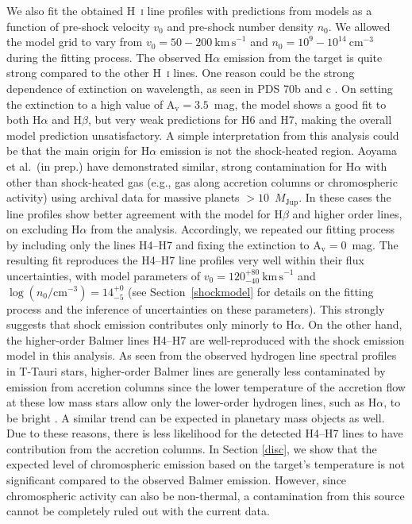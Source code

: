 \documentclass{aa}
\newcommand{\mj}{\ensuremath{M_\mathrm{Jup}}\xspace}
\newcommand{\Ha}{\ensuremath{\mathrm{H}\alpha}\xspace}
\newcommand{\Hb}{\ensuremath{\mathrm{H}\beta}\xspace}
\newcommand{\Hi}{H~\textsc{i}\xspace}
\newcommand{\kms}{\ensuremath{\mathrm{km\,s}^{-1}}\xspace}
\newcommand{\cmcube}{\ensuremath{\mathrm{cm}^{-3}}\xspace}
\begin{document}
We also fit the obtained \Hi line profiles with predictions from \cite{aoyama2020, aoyama2021} models as a function of pre-shock velocity $v_0$ and pre-shock number density $n_0$. We allowed the model grid to vary from $v_0= 50-200~\kms$ and $n_0=10^9-10^{14}~\cmcube$ during the fitting process. The observed \Ha emission from the target is quite strong compared to the other \Hi lines. One reason could be the strong dependence of extinction on wavelength, as seen in PDS 70b and c \citep{hashimoto2020}. On setting the extinction to a high value of $\mathrm{A_v=3.5}$~mag, the model shows a good fit to both \Ha and \Hb, but very weak predictions for H6 and H7, making the overall model prediction unsatisfactory. A simple interpretation from this analysis could be that the main origin for \Ha emission is not the shock-heated region. Aoyama et al.\ (in prep.) have demonstrated similar, strong contamination for \Ha with other than shock-heated gas (e.g., gas along accretion columns or chromospheric activity) using archival data for massive planets $>10$~\mj. In these cases the line profiles show better agreement with the model for \Hb and higher order lines, on excluding \Ha from the analysis. Accordingly, we repeated our fitting process by including only the lines H4--H7 and fixing the extinction to $\mathrm{A_v=0}$~mag. The resulting fit reproduces the H4--H7 line profiles very well within their flux uncertainties, with model parameters of $v_0=120^{+80}_{-40}~\kms$ and $\log(n_0/\mathrm{cm}^{-3})=14^{+0}_{-5}$ (see Section~\ref{shockmodel} for details on the fitting process and the inference of uncertainties on these parameters). This strongly suggests that shock emission contributes only minorly to \Ha. On the other hand, the higher-order Balmer lines H4--H7 are well-reproduced with the shock emission model in this analysis. As seen from the observed hydrogen line spectral profiles in T-Tauri stars, higher-order Balmer lines are generally less contaminated by emission from accretion columns since the lower temperature of the accretion flow at these low mass stars allow only the lower-order hydrogen lines, such as \Ha, to be bright \citep[see][]{hartmann2016}. A similar trend can be expected in planetary mass objects as well. Due to these reasons, there is less likelihood for the detected H4--H7 lines to have contribution from the accretion columns. In Section \ref{disc}, we show that the expected level of chromospheric emission based on the target's temperature is not significant compared to the observed Balmer emission. However, since chromospheric activity can also be non-thermal, a contamination from this source cannot be completely ruled out with the current data.
\end{document}
